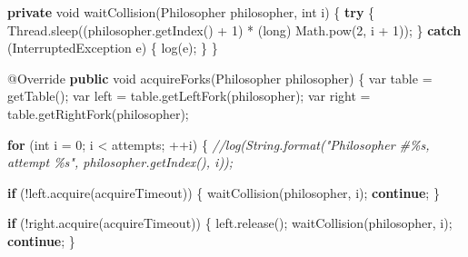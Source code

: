 \documentclass[11pt]{article}
\newenvironment{Shaded}{}{}
\newcommand{\KeywordTok}[1]{\textcolor[rgb]{0.00,0.44,0.13}{\textbf{{#1}}}}
\newcommand{\DataTypeTok}[1]{\textcolor[rgb]{0.56,0.13,0.00}{{#1}}}
\newcommand{\DecValTok}[1]{\textcolor[rgb]{0.25,0.63,0.44}{{#1}}}
\newcommand{\CommentTok}[1]{\textcolor[rgb]{0.38,0.63,0.69}{\textit{{#1}}}}
\newcommand{\FunctionTok}[1]{\textcolor[rgb]{0.02,0.16,0.49}{{#1}}}
\newcommand{\NormalTok}[1]{{#1}}
\newcommand{\ControlFlowTok}[1]{\textcolor[rgb]{0.00,0.44,0.13}{\textbf{{#1}}}}
\newcommand{\OperatorTok}[1]{\textcolor[rgb]{0.40,0.40,0.40}{{#1}}}
\newcommand{\BuiltInTok}[1]{{#1}}
\newcommand{\AttributeTok}[1]{\textcolor[rgb]{0.49,0.56,0.16}{{#1}}}
\begin{document}
\begin{Shaded}
\begin{Highlighting}[]
    \KeywordTok{private} \DataTypeTok{void} \FunctionTok{waitCollision}\OperatorTok{(}\NormalTok{Philosopher philosopher}\OperatorTok{,} \DataTypeTok{int}\NormalTok{ i}\OperatorTok{)} \OperatorTok{\{}
        \ControlFlowTok{try} \OperatorTok{\{}
            \BuiltInTok{Thread}\OperatorTok{.}\FunctionTok{sleep}\OperatorTok{((}\NormalTok{philosopher}\OperatorTok{.}\FunctionTok{getIndex}\OperatorTok{()} \OperatorTok{+} \DecValTok{1}\OperatorTok{)} \OperatorTok{*} \OperatorTok{(}\DataTypeTok{long}\OperatorTok{)} \BuiltInTok{Math}\OperatorTok{.}\FunctionTok{pow}\OperatorTok{(}\DecValTok{2}\OperatorTok{,}\NormalTok{ i }\OperatorTok{+} \DecValTok{1}\OperatorTok{));}
        \OperatorTok{\}} \ControlFlowTok{catch} \OperatorTok{(}\BuiltInTok{InterruptedException}\NormalTok{ e}\OperatorTok{)} \OperatorTok{\{}
            \FunctionTok{log}\OperatorTok{(}\NormalTok{e}\OperatorTok{);}
        \OperatorTok{\}}
    \OperatorTok{\}}

    \AttributeTok{@Override}
    \KeywordTok{public} \DataTypeTok{void} \FunctionTok{acquireForks}\OperatorTok{(}\NormalTok{Philosopher philosopher}\OperatorTok{)} \OperatorTok{\{}
        \DataTypeTok{var}\NormalTok{ table }\OperatorTok{=} \FunctionTok{getTable}\OperatorTok{();}
        \DataTypeTok{var}\NormalTok{ left }\OperatorTok{=}\NormalTok{ table}\OperatorTok{.}\FunctionTok{getLeftFork}\OperatorTok{(}\NormalTok{philosopher}\OperatorTok{);}
        \DataTypeTok{var}\NormalTok{ right }\OperatorTok{=}\NormalTok{ table}\OperatorTok{.}\FunctionTok{getRightFork}\OperatorTok{(}\NormalTok{philosopher}\OperatorTok{);}

        \ControlFlowTok{for} \OperatorTok{(}\DataTypeTok{int}\NormalTok{ i }\OperatorTok{=} \DecValTok{0}\OperatorTok{;}\NormalTok{ i }\OperatorTok{\textless{}}\NormalTok{ attempts}\OperatorTok{;} \OperatorTok{++}\NormalTok{i}\OperatorTok{)} \OperatorTok{\{}
            \CommentTok{//log(String.format("Philosopher \#\%s, attempt \%s", philosopher.getIndex(), i));}

            \ControlFlowTok{if} \OperatorTok{(!}\NormalTok{left}\OperatorTok{.}\FunctionTok{acquire}\OperatorTok{(}\NormalTok{acquireTimeout}\OperatorTok{))} \OperatorTok{\{}
                \FunctionTok{waitCollision}\OperatorTok{(}\NormalTok{philosopher}\OperatorTok{,}\NormalTok{ i}\OperatorTok{);}
                \ControlFlowTok{continue}\OperatorTok{;}
            \OperatorTok{\}}

            \ControlFlowTok{if} \OperatorTok{(!}\NormalTok{right}\OperatorTok{.}\FunctionTok{acquire}\OperatorTok{(}\NormalTok{acquireTimeout}\OperatorTok{))} \OperatorTok{\{}
\NormalTok{                left}\OperatorTok{.}\FunctionTok{release}\OperatorTok{();}
                \FunctionTok{waitCollision}\OperatorTok{(}\NormalTok{philosopher}\OperatorTok{,}\NormalTok{ i}\OperatorTok{);}
                \ControlFlowTok{continue}\OperatorTok{;}
            \OperatorTok{\}}


\end{Highlighting}
\end{Shaded}
\end{document}
